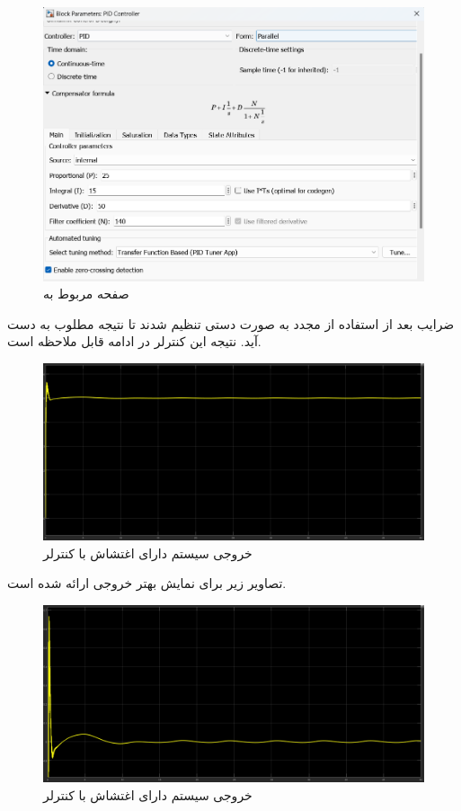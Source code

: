 \documentclass[14pt, a4paper]{extarticle}
\begin{document}
 \begin{figure}[h!]
 	\centering
 	\includegraphics[scale = 0.5]{Q1_4_pid.png}
 	\caption{صفحه مربوط به 
 		}
 \end{figure}

ضرایب 
بعد از استفاده از 
مجدد به صورت دستی تنظیم شدند تا نتیجه مطلوب به دست آید. نتیجه این کنترلر در ادامه قابل ملاحظه است.
\begin{figure}[h!]
	\centering
	\includegraphics[scale = 0.4]{Q1_4_result1.png}
	\caption{خروجی سیستم دارای اغتشاش با کنترلر 
		}
\end{figure}


\newpage

تصاویر زیر برای نمایش بهتر خروجی ارائه شده است.

\begin{figure}[h!]
	\centering
	\includegraphics[scale = 0.4]{Q1_4_result2.png}
	\caption{خروجی سیستم دارای اغتشاش با کنترلر 
		}
\end{figure}
\end{document}
